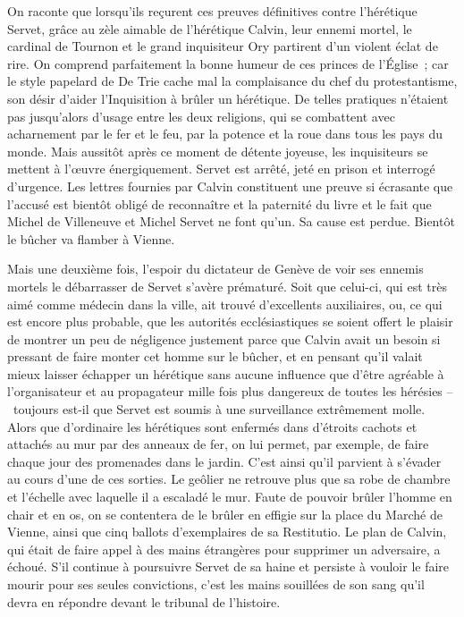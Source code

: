 \documentclass[french,twoside]{book} %
\newcommand\chapterclose{} %
\begin{document}
\noindent On raconte que lorsqu’ils reçurent ces preuves définitives contre l’hérétique Servet, grâce au zèle aimable de l’hérétique Calvin, leur ennemi mortel, le cardinal de Tournon et le grand inquisiteur Ory partirent d’un violent éclat de rire. On comprend parfaitement la bonne humeur de ces princes de l’Église ; car le style papelard de De Trie cache mal la complaisance du chef du protestantisme, son désir d’aider l’Inquisition à brûler un hérétique. De telles pratiques n’étaient pas jusqu’alors d’usage entre les deux religions, qui se combattent avec acharnement par le fer et le feu, par la potence et la roue dans tous les pays du monde. Mais aussitôt après ce moment de détente joyeuse, les inquisiteurs se mettent à l’œuvre énergiquement. Servet est arrêté, jeté en prison et interrogé d’urgence. Les lettres fournies par Calvin constituent une preuve si écrasante que l’accusé est bientôt obligé de reconnaître et la paternité du livre et le fait que Michel de Villeneuve et Michel Servet ne font qu’un. Sa cause est perdue. Bientôt le bûcher va flamber à Vienne.\par
Mais une deuxième fois, l’espoir du dictateur de Genève de voir ses ennemis mortels le débarrasser de Servet s’avère prématuré. Soit que celui-ci, qui est très aimé comme médecin dans la ville, ait trouvé d’excellents auxiliaires, ou, ce qui est encore plus probable, que les autorités ecclésiastiques se soient offert le plaisir de montrer un peu de négligence justement parce que Calvin avait un besoin si pressant de faire monter cet homme sur le bûcher, et en pensant qu’il valait mieux laisser échapper un hérétique sans aucune influence que d’être agréable à l’organisateur et au propagateur mille fois plus dangereux de toutes les hérésies – toujours est-il que Servet est soumis à une surveillance extrêmement molle. Alors que d’ordinaire les hérétiques sont enfermés dans d’étroits cachots et attachés au mur par des anneaux de fer, on lui permet, par exemple, de faire chaque jour des promenades dans le jardin. C’est ainsi qu’il parvient à s’évader au cours d’une de ces sorties. Le geôlier ne retrouve plus que sa robe de chambre et l’échelle avec laquelle il a escaladé le mur. Faute de pouvoir brûler l’homme en chair et en os, on se contentera de le brûler en effigie sur la place du Marché de Vienne, ainsi que cinq ballots d’exemplaires de sa Restitutio. Le plan de Calvin, qui était de faire appel à des mains étrangères pour supprimer un adversaire, a échoué. S’il continue à poursuivre Servet de sa haine et persiste à vouloir le faire mourir pour ses seules convictions, c’est les mains souillées de son sang qu’il devra en répondre devant le tribunal de l’histoire.
\chapterclose
\end{document}

